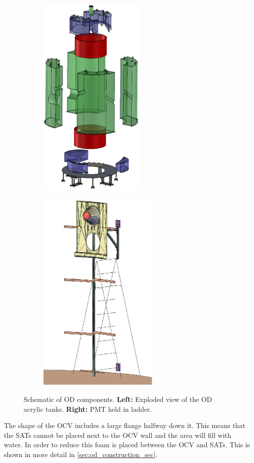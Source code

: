 \begin{figure}[!tbph]
  \begin{subfigure}{.5\textwidth}
  \centering
  \includegraphics[height=10cm]{Figures/LZ/OD_Tanks_CAD.png}
  \end{subfigure}
  \begin{subfigure}{.5\textwidth}
  \centering
  \includegraphics[height=10cm]{Figures/LZ/pmt_in_ladder.png}
  \end{subfigure}
\caption{Schematic of OD components. \textbf{Left:} Exploded view of the OD acrylic tanks. \textbf{Right:} PMT held in ladder.}
\label{fig:LZ_OD_schematic}
\end{figure}

\par
The shape of the OCV includes a large flange halfway down it. 
This means that the SATs cannot be placed next to the OCV wall and the area will fill with water.
In order to reduce this foam is placed between the OCV and SATs.
This is shown in more detail in \autoref{sec:od_construction_sec}.

